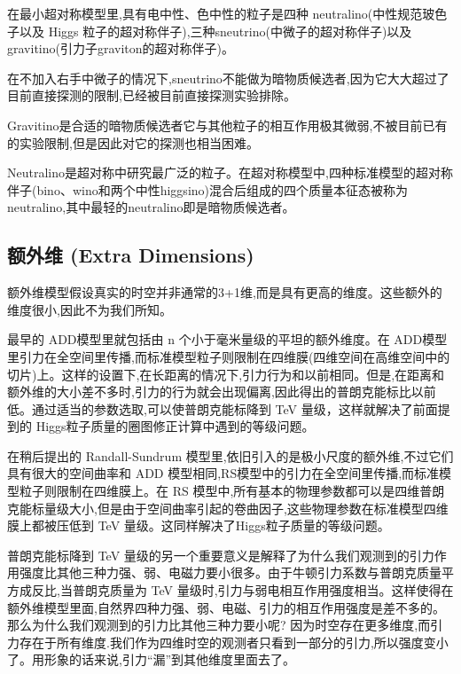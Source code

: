 \documentclass{beamer} %
\begin{document}
\begin{frame}
在最小超对称模型里,具有电中性、色中性的粒子是四种 neutralino(中性规范玻色子以及 Higgs 粒子的超对称伴子),三种sneutrino(中微子的超对称伴子)以及 gravitino(引力子graviton的超对称伴子)。

在不加入右手中微子的情况下,sneutrino不能做为暗物质候选者,因为它大大超过了目前直接探测的限制,已经被目前直接探测实验排除。

Gravitino是合适的暗物质候选者它与其他粒子的相互作用极其微弱,不被目前已有的实验限制,但是因此对它的探测也相当困难。

Neutralino是超对称中研究最广泛的粒子。在超对称模型中,四种标准模型的超对称伴子(bino、wino和两个中性higgsino)混合后组成的四个质量本征态被称为neutralino,其中最轻的neutralino即是暗物质候选者。
\end{frame}

\subsection{额外维 (Extra Dimensions) }

\begin{frame}
额外维模型假设真实的时空并非通常的3+1维,而是具有更高的维度。这些额外的维度很小,因此不为我们所知。

最早的 ADD模型里就包括由 n 个小于毫米量级的平坦的额外维度。在 ADD模型里引力在全空间里传播,而标准模型粒子则限制在四维膜(四维空间在高维空间中的切片)上。这样的设置下,在长距离的情况下,引力行为和以前相同。但是,在距离和额外维的大小差不多时,引力的行为就会出现偏离,因此得出的普朗克能标比以前低。通过适当的参数选取,可以使普朗克能标降到 TeV 量级，这样就解决了前面提到的 Higgs粒子质量的圈图修正计算中遇到的等级问题。
\end{frame}

\begin{frame}
在稍后提出的 Randall-Sundrum 模型里,依旧引入的是极小尺度的额外维,不过它们具有很大的空间曲率和 ADD 模型相同,RS模型中的引力在全空间里传播,而标准模型粒子则限制在四维膜上。在 RS 模型中,所有基本的物理参数都可以是四维普朗克能标量级大小,但是由于空间曲率引起的卷曲因子,这些物理参数在标准模型四维膜上都被压低到 TeV 量级。这同样解决了Higgs粒子质量的等级问题。

普朗克能标降到 TeV 量级的另一个重要意义是解释了为什么我们观测到的引力作用强度比其他三种力强、弱、电磁力要小很多。由于牛顿引力系数与普朗克质量平方成反比,当普朗克质量为 TeV 量级时,引力与弱电相互作用强度相当。这样使得在额外维模型里面,自然界四种力强、弱、电磁、引力的相互作用强度是差不多的。那么为什么我们观测到的引力比其他三种力要小呢? 因为时空存在更多维度,而引力存在于所有维度.我们作为四维时空的观测者只看到一部分的引力,所以强度变小了。用形象的话来说,引力“漏”到其他维度里面去了。
\end{frame}
\end{document}
